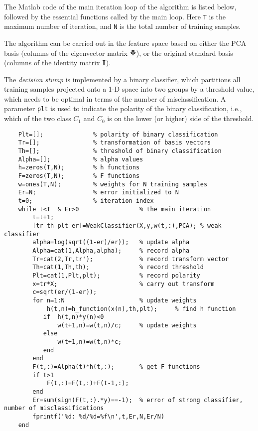 \documentclass{article}
\begin{document}
The Matlab code of the main iteration loop of the algorithm is 
listed below, followed by the essential functions called by the 
main loop. Here \verb|T| is the maximum number of iteration, and
\verb|N| is the total number of training samples. 

The algorithm can be carried out in the feature space based on
either the PCA basis (columns of the eigenvector matrix ${\bf\Phi}$),
or the original standard basis (columns of the identity matrix 
${\bf I}$). 

The {\em decision stump} is implemented by a binary classifier, 
which partitions all training samples projected onto a 1-D space 
into two groups by a threshold value, which needs to be optimal in
terms of the number of misclassification. A parameter \verb|plt| is
used to indicate the polarity of the binary classification, i.e.,
which of the two class $C_1$ and $C_0$ is on the lower (or higher)
side of the threshold.

\begin{verbatim}
    Plt=[];              % polarity of binary classification
    Tr=[];               % transformation of basis vectors
    Th=[];               % threshold of binary classification
    Alpha=[];            % alpha values 
    h=zeros(T,N);        % h functions 
    F=zeros(T,N);        % F functions
    w=ones(T,N);         % weights for N training samples
    Er=N;                % error initialized to N
    t=0;                 % iteration index
    while t<T  & Er>0                 % the main iteration
        t=t+1;                        
        [tr th plt er]=WeakClassifier(X,y,w(t,:),PCA); % weak classifier
        alpha=log(sqrt((1-er)/er));   % update alpha   
        Alpha=cat(1,Alpha,alpha);     % record alpha
        Tr=cat(2,Tr,tr');             % record transform vector
        Th=cat(1,Th,th);              % record threshold 
        Plt=cat(1,Plt,plt);           % record polarity
        x=tr*X;                       % carry out transform
        c=sqrt(er/(1-er));
        for n=1:N                     % update weights
            h(t,n)=h_function(x(n),th,plt);     % find h function
           if  h(t,n)*y(n)<0
               w(t+1,n)=w(t,n)/c;     % update weights
           else
               w(t+1,n)=w(t,n)*c;
           end            
        end      
        F(t,:)=Alpha(t)*h(t,:);       % get F functions
        if t>1
            F(t,:)=F(t,:)+F(t-1,:);
        end
        Er=sum(sign(F(t,:).*y)==-1);  % error of strong classifier, number of misclassifications
        fprintf('%d: %d/%d=%f\n',t,Er,N,Er/N)
    end
\end{verbatim}
\end{document}

